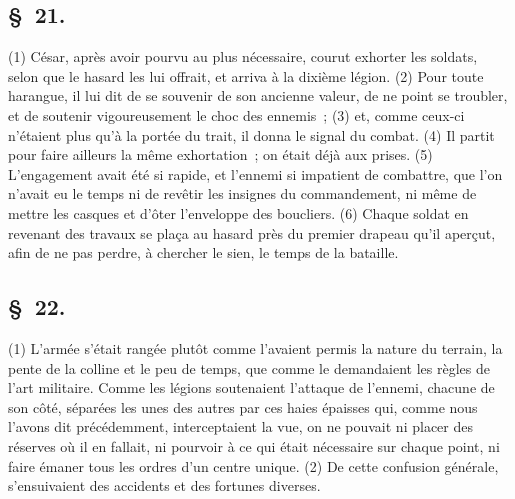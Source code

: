 \documentclass[french,twoside]{book} %
\begin{document}
\subsection[{§ 21.}]{ \textsc{§ 21.} }
\noindent (1) César, après avoir pourvu au plus nécessaire, courut exhorter les soldats, selon que le hasard les lui offrait, et arriva à la dixième légion. (2) Pour toute harangue, il lui dit de se souvenir de son ancienne valeur, de ne point se troubler, et de soutenir vigoureusement le choc des ennemis ; (3) et, comme ceux-ci n’étaient plus qu’à la portée du trait, il donna le signal du combat. (4) Il partit pour faire ailleurs la même exhortation ; on était déjà aux prises. (5) L'engagement avait été si rapide, et l’ennemi si impatient de combattre, que l’on n’avait eu le temps ni de revêtir les insignes du commandement, ni même de mettre les casques et d’ôter l’enveloppe des boucliers. (6) Chaque soldat en revenant des travaux se plaça au hasard près du premier drapeau qu’il aperçut, afin de ne pas perdre, à chercher le sien, le temps de la bataille.
\subsection[{§ 22.}]{ \textsc{§ 22.} }
\noindent (1) L'armée s’était rangée plutôt comme l’avaient permis la nature du terrain, la pente de la colline et le peu de temps, que comme le demandaient les règles de l’art militaire. Comme les légions soutenaient l’attaque de l’ennemi, chacune de son côté, séparées les unes des autres par ces haies épaisses qui, comme nous l’avons dit précédemment, interceptaient la vue, on ne pouvait ni placer des réserves où il en fallait, ni pourvoir à ce qui était nécessaire sur chaque point, ni faire émaner tous les ordres d’un centre unique. (2) De cette confusion générale, s’ensuivaient des accidents et des fortunes diverses.
\end{document}
